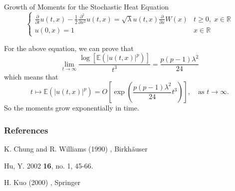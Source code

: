 \documentclass{beamer}%
\numberwithin{equation}{section}
\newcommand{\R}{\mathbb{R}}
\begin{document}
	\begin{frame}[t]{Growth of Moments for the Stochastic Heat Equation}
		\[
		\begin{cases}
		\frac{\partial}{\partial t} u(t,x) - \frac{1}{2}\frac{\partial^2}{\partial x^2} u(t,x) = \sqrt{\lambda} u(t,x) \frac{\partial}{\partial x}W(x) & t \ge 0, \; x\in \R \\
		u(0, x) = 1 & x \in \R
		\end{cases}
		\]
		\begin{theorem}[Hu 2002]
			For the above equation, we can prove that 
			\[
			\lim_{t \to \infty} \frac{\log\left[ \mathbb{E}(|u(t,x)|^p) \right]}{t^3} = \frac{p(p-1)\lambda^2}{24}
			\]
			which means that 
			\[
			t \mapsto \mathbb{E}(|u(t,x)|^p) = O\left[ \exp\left( \frac{p(p-1)\lambda^2}{24} t^3\right) \right], \quad \text{as } t \to \infty.
			\]
			So the moments grow exponentially in time.
		\end{theorem}
		
		
	\end{frame}
	\begin{frame}
		\frametitle{References}
		\small
		
		\begin{thebibliography}{999}
			K. Chung and R. Williams (1990)
			, Birkh\"auser
			
			Hu, Y. 2002
			 \textbf{16}, no. 1, 45-66.
			
			H. Kuo (2000)
			, Springer
		\end{thebibliography}
	\end{frame}
	
\end{document}
